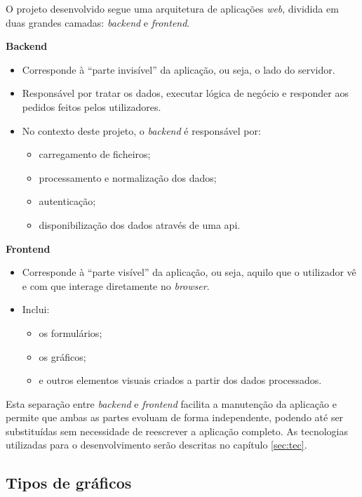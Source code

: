 O projeto desenvolvido segue uma arquitetura de aplicações \textit{web}, dividida em duas grandes camadas: \textit{backend} e \textit{frontend}.

\textbf{Backend}

\begin{itemize}
    \item Corresponde à ``parte invisível'' da aplicação, ou seja, o lado do servidor.
    \item Responsável por tratar os dados, executar lógica de negócio e responder aos pedidos feitos pelos utilizadores.
    \item No contexto deste projeto, o \textit{backend} é responsável por:
    \begin{itemize}
        \item carregamento de ficheiros;
        \item processamento e normalização dos dados;
        \item autenticação;
        \item disponibilização dos dados através de uma \gls{api}.
    \end{itemize}
\end{itemize}

\textbf{Frontend}

\begin{itemize}
    \item Corresponde à ``parte visível'' da aplicação, ou seja, aquilo que o utilizador vê e com que interage diretamente no \textit{browser}.
    \item Inclui:
    \begin{itemize}
        \item os formulários;
        \item os gráficos;
        \item e outros elementos visuais criados a partir dos dados processados.
    \end{itemize}
\end{itemize}

Esta separação entre \textit{backend} e \textit{frontend} facilita a manutenção da aplicação e permite que ambas as partes evoluam de forma independente, podendo até ser substituídas sem necessidade de reescrever a aplicação completo. As tecnologias utilizadas para o desenvolvimento serão descritas no capítulo \ref{sec:tec}.

\subsection{Tipos de gráficos}

